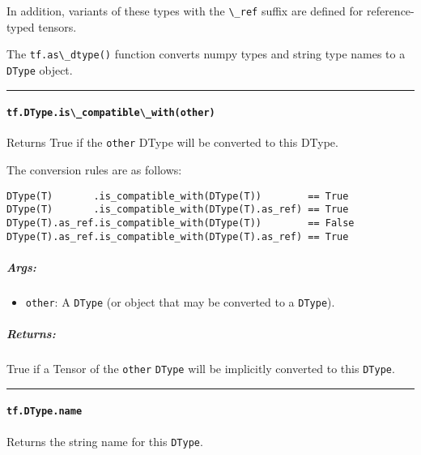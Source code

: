 In addition, variants of these types with the \lstinline{\_ref} suffix are
defined for reference-typed tensors.

The \lstinline{tf.as\_dtype()} function converts numpy types and string
type names to a \lstinline{DType} object.

\begin{center}\rule{0.5\linewidth}{\linethickness}\end{center}

\paragraph{\texorpdfstring{\lstinline{tf.DType.is\_compatible\_with(other)}
}{tf.DType.is\_compatible\_with(other) }}\label{tf.dtype.isux5fcompatibleux5fwithother}

Returns True if the \lstinline{other} DType will be converted to this
DType.

The conversion rules are as follows:

\begin{lstlisting}
DType(T)       .is_compatible_with(DType(T))        == True
DType(T)       .is_compatible_with(DType(T).as_ref) == True
DType(T).as_ref.is_compatible_with(DType(T))        == False
DType(T).as_ref.is_compatible_with(DType(T).as_ref) == True
\end{lstlisting}

\subparagraph{Args: }\label{args-18}

\begin{itemize}
\tightlist
\item
  \lstinline{other}: A \lstinline{DType} (or object that may be converted to a
  \lstinline{DType}).
\end{itemize}

\subparagraph{Returns: }\label{returns-22}

True if a Tensor of the \lstinline{other} \lstinline{DType} will be implicitly
converted to this \lstinline{DType}.

\begin{center}\rule{0.5\linewidth}{\linethickness}\end{center}

\paragraph{\texorpdfstring{\lstinline{tf.DType.name}
}{tf.DType.name }}\label{tf.dtype.name}

Returns the string name for this \lstinline{DType}.

